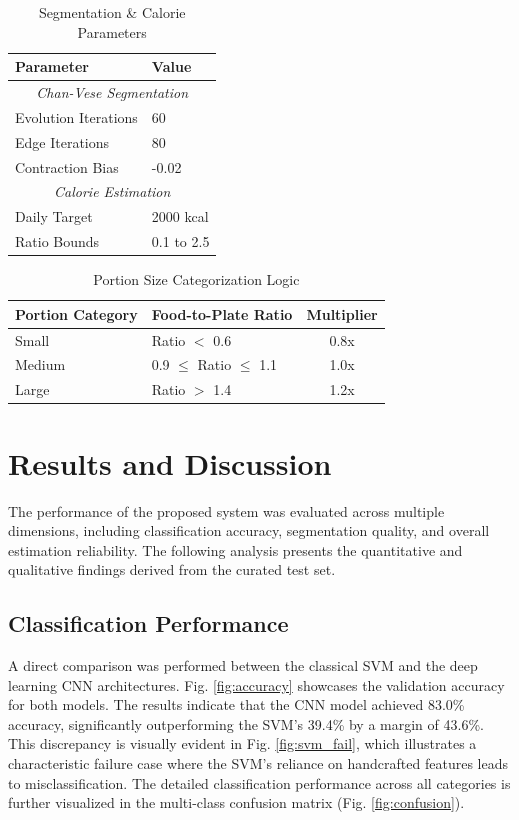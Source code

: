 \documentclass[conference, a4paper]{IEEEtran}
\begin{document}
\begin{table}[!t]
\caption{Segmentation \& Calorie Parameters}
\begin{center}
\begin{tabular}{ll}
\toprule
\textbf{Parameter} & \textbf{Value} \\
\midrule
\multicolumn{2}{c}{\textit{Chan-Vese Segmentation}} \\
Evolution Iterations & 60 \\
Edge Iterations & 80 \\
Contraction Bias & -0.02 \\
\midrule
\multicolumn{2}{c}{\textit{Calorie Estimation}} \\
Daily Target & 2000 kcal \\
Ratio Bounds & 0.1 to 2.5 \\
\bottomrule
\end{tabular}
\label{tab:seg_params}
\end{center}
\end{table}

\begin{table}[!t]
\caption{Portion Size Categorization Logic}
\begin{center}
\begin{tabular}{llc}
\toprule
\textbf{Portion Category} & \textbf{Food-to-Plate Ratio} & \textbf{Multiplier} \\
\midrule
Small & Ratio $<$ 0.6 & 0.8x \\
Medium & 0.9 $\leq$ Ratio $\leq$ 1.1 & 1.0x \\
Large & Ratio $>$ 1.4 & 1.2x \\
\bottomrule
\end{tabular}
\label{tab:portion_thresholds}
\end{center}
\end{table}

\section{Results and Discussion}
\label{sec:results}

The performance of the proposed system was evaluated across multiple dimensions, including classification accuracy, segmentation quality, and overall estimation reliability. The following analysis presents the quantitative and qualitative findings derived from the curated test set.

\subsection{Classification Performance}
A direct comparison was performed between the classical SVM and the deep learning CNN architectures. Fig. \ref{fig:accuracy} showcases the validation accuracy for both models. The results indicate that the CNN model achieved 83.0\% accuracy, significantly outperforming the SVM's 39.4\% by a margin of 43.6\%. This discrepancy is visually evident in Fig. \ref{fig:svm_fail}, which illustrates a characteristic failure case where the SVM's reliance on handcrafted features leads to misclassification. The detailed classification performance across all categories is further visualized in the multi-class confusion matrix (Fig. \ref{fig:confusion}).
\end{document}
